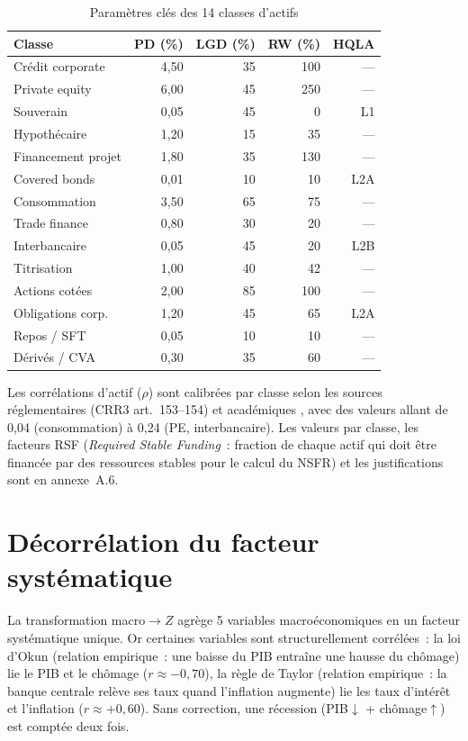 \documentclass[10pt, a4paper, oneside]{report}
\theoremstyle{definition}
\begin{document}
\begin{table}[htbp]
\centering
\caption{Paramètres clés des 14 classes d'actifs}
\label{tab:params-14}
\small
\begin{tabular}{lrrrr}
\toprule
Classe & PD (\%) & LGD (\%) & RW (\%) & HQLA \\
\midrule
Crédit corporate & 4{,}50 & 35 & 100 & --- \\
Private equity & 6{,}00 & 45 & 250 & --- \\
Souverain & 0{,}05 & 45 & 0 & L1 \\
Hypothécaire & 1{,}20 & 15 & 35 & --- \\
Financement projet & 1{,}80 & 35 & 130 & --- \\
Covered bonds & 0{,}01 & 10 & 10 & L2A \\
Consommation & 3{,}50 & 65 & 75 & --- \\
Trade finance & 0{,}80 & 30 & 20 & --- \\
Interbancaire & 0{,}05 & 45 & 20 & L2B \\
Titrisation & 1{,}00 & 40 & 42 & --- \\
Actions cotées & 2{,}00 & 85 & 100 & --- \\
Obligations corp. & 1{,}20 & 45 & 65 & L2A \\
Repos / SFT & 0{,}05 & 10 & 10 & --- \\
Dérivés / CVA & 0{,}30 & 35 & 60 & --- \\
\bottomrule
\end{tabular}
\end{table}

Les corrélations d'actif ($\rho$) sont calibrées par classe selon les sources réglementaires (CRR3 art.~153--154) et académiques \citep{longstaff2011}, avec des valeurs allant de 0{,}04 (consommation) à 0{,}24 (PE, interbancaire). Les valeurs par classe, les facteurs RSF (\emph{Required Stable Funding}~: fraction de chaque actif qui doit être financée par des ressources stables pour le calcul du NSFR) et les justifications sont en annexe~A.6.


\section{Décorrélation du facteur systématique}
\label{sec:ch3:decorrelation}

La transformation macro$\to Z$ agrège 5 variables macroéconomiques en un facteur systématique unique. Or certaines variables sont structurellement corrélées~: la loi d'Okun (relation empirique~: une baisse du PIB entraîne une hausse du chômage) lie le PIB et le chômage ($r \approx -0{,}70$), la règle de Taylor (relation empirique~: la banque centrale relève ses taux quand l'inflation augmente) lie les taux d'intérêt et l'inflation ($r \approx +0{,}60$). Sans correction, une récession (PIB$\downarrow$ + chômage$\uparrow$) est comptée deux fois.
\end{document}

